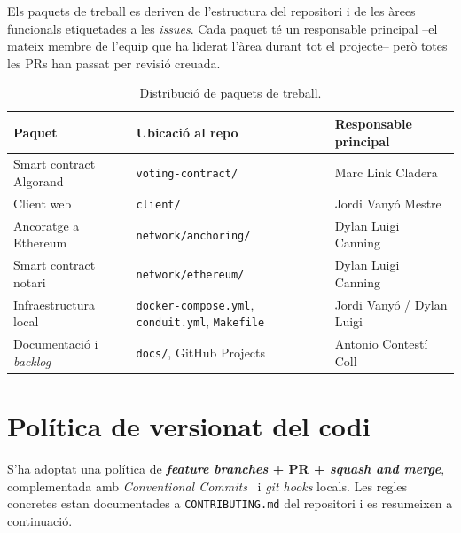 Els paquets de treball es deriven de l'estructura del repositori i de les àrees funcionals etiquetades a les
\emph{issues}.
Cada paquet té un responsable principal --el mateix membre de l'equip que ha liderat l'àrea durant tot el projecte--
però totes les \acsp{PR} han passat per revisió creuada.

\begin{table}[ht]
    \centering
    \small
    \begin{tabular}{@{}p{3cm}p{4.2cm}p{4.5cm}@{}}
        \toprule
        \textbf{Paquet}               & \textbf{Ubicació al repo}                                            & \textbf{Responsable principal} \\
        \midrule
        Smart contract Algorand       & \texttt{voting-contract/}                                            & Marc Link Cladera              \\
        Client web                    & \texttt{client/}                                                     & Jordi Vanyó Mestre             \\
        Ancoratge a Ethereum          & \texttt{network/anchoring/}                                          & Dylan Luigi Canning            \\
        Smart contract notari         & \texttt{network/ethereum/}                                           & Dylan Luigi Canning            \\
        Infraestructura local         & \texttt{docker-compose.yml}, \texttt{conduit.yml}, \texttt{Makefile} & Jordi Vanyó / Dylan Luigi \\
        Documentació i \emph{backlog} & \texttt{docs/}, GitHub Projects                                      & Antonio Contestí Coll          \\
        \bottomrule
    \end{tabular}
    \caption{Distribució de paquets de treball.}
    \label{tab:paquets}
\end{table}



\section{Política de versionat del codi}
\label{sec:versionat}

S'ha adoptat una política de \textbf{\emph{feature branches} + \ac{PR} + \emph{squash and merge}}, complementada amb
\emph{Conventional Commits}~\cite{conventionalcommits} i \emph{git hooks} locals.
Les regles concretes estan documentades a \texttt{CONTRIBUTING.md} del repositori i es resumeixen a continuació.

